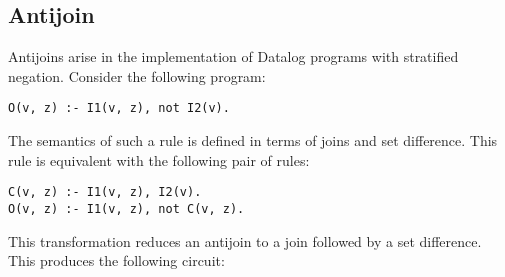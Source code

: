 
\subsection{Antijoin}\label{sec:antijoin}

Antijoins arise in the implementation of Datalog programs with stratified negation.
Consider the following program:

\begin{lstlisting}[language=ddlog,basicstyle=\small]
O(v, z) :- I1(v, z), not I2(v).     
\end{lstlisting}

The semantics of such a rule is defined in terms of joins and set difference.
This rule is equivalent with the following pair of rules:

\begin{lstlisting}[language=ddlog,basicstyle=\small]
C(v, z) :- I1(v, z), I2(v).
O(v, z) :- I1(v, z), not C(v, z).     
\end{lstlisting}

This transformation reduces an antijoin to a join 
followed by a set difference.  This produces the following \dbsp circuit:


